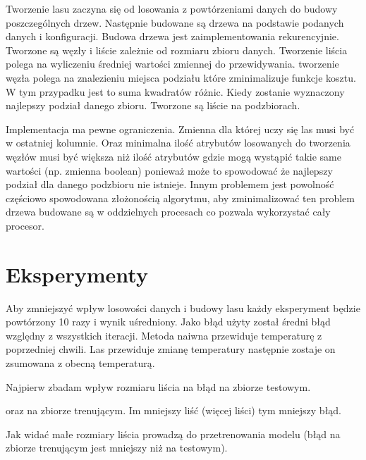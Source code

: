 \documentclass[letterpaper,10pt,english]{sphinxmanual}
\begin{document}
Tworzenie lasu zaczyna się od losowania z powtórzeniami danych do budowy poszczególnych drzew.
Następnie budowane są drzewa na podstawie podanych danych i konfiguracji.
Budowa drzewa jest zaimplementowania rekurencyjnie. Tworzone są węzły i liście zależnie od rozmiaru zbioru danych.
Tworzenie liścia polega na wyliczeniu średniej wartości zmiennej do przewidywania.
tworzenie węzła polega na znalezieniu miejsca podziału które zminimalizuje funkcje kosztu.
W tym przypadku jest to suma kwadratów różnic. Kiedy zostanie wyznaczony najlepszy podział danego zbioru.
Tworzone są liście na podzbiorach.

Implementacja ma pewne ograniczenia. Zmienna dla której uczy się las musi być w ostatniej kolumnie.
Oraz minimalna ilość atrybutów losowanych do tworzenia węzłów musi być większa niż ilość atrybutów
gdzie mogą wystąpić takie same wartości (np. zmienna boolean) ponieważ może to spowodować że najlepszy
podział dla danego podzbioru nie istnieje. Innym problemem jest powolność częściowo spowodowana złożonością algorytmu,
aby zminimalizować ten problem drzewa budowane są w oddzielnych procesach co pozwala wykorzystać cały procesor.


\section{Eksperymenty}
\label{\detokenize{main:eksperymenty}}
Aby zmniejszyć wpływ losowości danych i budowy lasu każdy eksperyment będzie powtórzony 10 razy i wynik uśredniony.
Jako błąd użyty został średni błąd względny z wszystkich iteracji.
Metoda naiwna przewiduje temperaturę z poprzedniej chwili.
Las przewiduje zmianę temperatury następnie zostaje on zsumowana z obecną temperaturą.

Najpierw zbadam wpływ rozmiaru liścia na błąd na zbiorze testowym.

\begin{figure}[htbp]
\centering

\noindent{}
\end{figure}

oraz na zbiorze trenującym.
Im mniejszy liść (więcej liści) tym mniejszy błąd.

\begin{figure}[htbp]
\centering

\noindent{}
\end{figure}

Jak widać małe rozmiary liścia prowadzą do przetrenowania modelu (błąd na zbiorze trenującym jest mniejszy niż na testowym).
\end{document}
